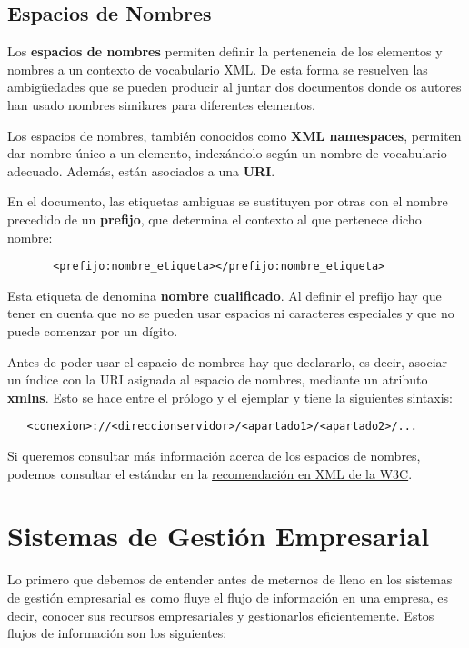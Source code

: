 \subsection{Espacios de Nombres}
Los \textbf{espacios de nombres} permiten definir la pertenencia de los elementos y nombres a un contexto de vocabulario XML. De esta forma se resuelven las ambigüedades que se pueden producir al juntar dos documentos donde os autores han usado nombres similares para diferentes elementos.

Los espacios de nombres, también conocidos como \textbf{XML namespaces}, permiten dar nombre único a un elemento, indexándolo según un nombre de vocabulario adecuado. Además, están asociados a una \textbf{\gls{URI}}.

En el documento, las etiquetas ambiguas se sustituyen por otras con el nombre precedido de un \textbf{prefijo}, que determina el contexto al que pertenece dicho nombre:

\begin{tcolorbox}[sharp corners, colback=yellow!40, colframe=white!20]
    \begin{verbatim}       <prefijo:nombre_etiqueta></prefijo:nombre_etiqueta>\end{verbatim}
\end{tcolorbox}

Esta etiqueta de denomina \textbf{nombre cualificado}. Al definir el prefijo hay que tener en cuenta que no se pueden usar espacios ni caracteres especiales y que no puede comenzar por un dígito.

Antes de poder usar el espacio de nombres hay que declararlo, es decir, asociar un índice con la URI asignada al espacio de nombres, mediante un atributo \textbf{xmlns}. Esto se hace entre el prólogo y el ejemplar y tiene la siguientes sintaxis:

\begin{tcolorbox}[sharp corners, colback=yellow!40, colframe=white!20]
    \begin{verbatim}   <conexion>://<direccionservidor>/<apartado1>/<apartado2>/...\end{verbatim}
\end{tcolorbox}

Si queremos consultar más información acerca de los espacios de nombres, podemos consultar el estándar en la \href{https://www.w3.org/TR/REC-xml-names/}{recomendación en XML de la W3C}.

\section{Sistemas de Gestión Empresarial}
Lo primero que debemos de entender antes de meternos de lleno en los sistemas de gestión empresarial es como fluye el flujo de información en una empresa, es decir, conocer sus recursos empresariales y gestionarlos eficientemente. Estos flujos de información son los siguientes:

